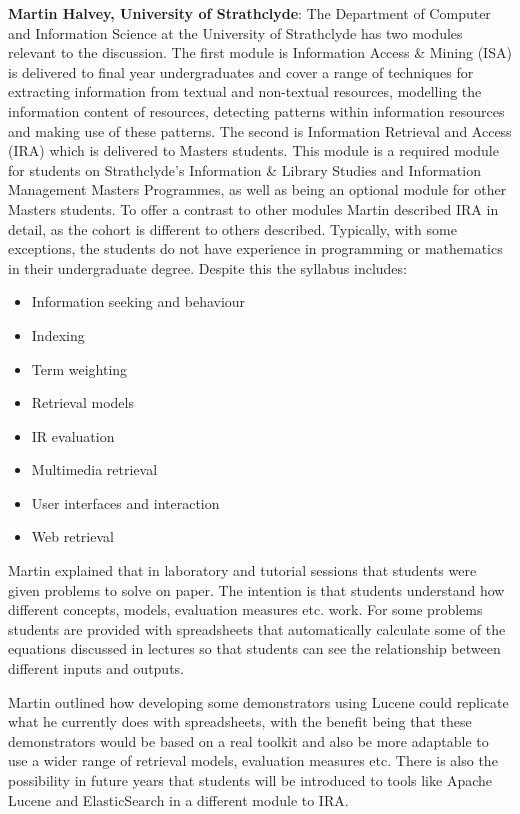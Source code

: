 {\bf Martin Halvey, University of Strathclyde}: The Department of Computer and Information Science at the University of Strathclyde has two modules relevant to the discussion. The first module is Information Access & Mining (ISA) is delivered to final year undergraduates and cover a range of techniques for extracting information from textual and non-textual resources, modelling the information content of resources, detecting patterns within information resources and making use of these patterns. The second is Information Retrieval and Access (IRA) which is delivered to Masters students. This module is a required module for students on Strathclyde's Information & Library Studies and Information Management Masters Programmes, as well as being an optional module for other Masters students. To offer a contrast to other modules Martin described IRA in detail, as the cohort is different to others described. Typically, with some exceptions, the students do not have experience in programming or mathematics in their undergraduate degree. Despite this the syllabus includes:
\begin{itemize}
    \item Information seeking and behaviour
	\item Indexing
	\item Term weighting
	\item Retrieval models
	\item IR evaluation
	\item Multimedia retrieval
	\item User interfaces and interaction
	\item Web retrieval
\end{itemize}

Martin explained that in laboratory and tutorial sessions that students were given problems to solve on paper. The intention is that students understand how different concepts, models, evaluation measures etc. work. For some problems students are provided with spreadsheets that automatically calculate some of the equations discussed in lectures so that students can see the relationship between different inputs and outputs. 

Martin outlined how developing some demonstrators using Lucene could replicate what he currently does with spreadsheets, with the benefit being that these demonstrators would be based on a real toolkit and also be more adaptable to use a wider range of retrieval models, evaluation measures etc. There is also the possibility in future years that students will be introduced to tools like Apache Lucene and ElasticSearch in a different module to IRA.

